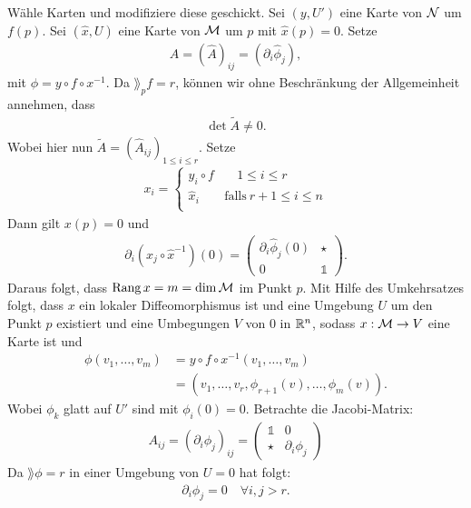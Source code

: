 \begin{bew}
Wähle Karten und modifiziere diese geschickt.
Sei $(y, U')$ eine Karte von $\mathcal{N}$ um $f(p)$.
Sei $(\hat{x}, U)$ eine Karte von $\mathcal{M}$ um $p$ mit $\hat{x}(p) = 0$.
Setze 
\begin{align*}
\hat{A} = (\hat{A})_{i j} = (\partial_i \hat{\phi}_j),
\end{align*}
mit $\phi = y \circ f \circ x^{-1}$.
Da $\rang_p f = r$, können wir ohne Beschränkung der Allgemeinheit annehmen, dass
\begin{align*}
\det \tilde{A} \neq 0.
\end{align*}
Wobei hier nun $\tilde{A} = (\hat{A}_{i j})_{1 \leq i \leq r}$.
Setze 
\begin{align*}
x_i = \left\{
\begin{array}{ll}
y_i \circ f & \quad 1 \leq i \leq r \\
\hat{x}_i & \textrm{falls} \ r+1 \leq i \leq n \\
\end{array}
\right. 
\end{align*}
Dann gilt $x(p)=0$ und 
\begin{align*}
\partial_i (x_j \circ \hat{x}^{-1})(0) = 
\left(\begin{matrix}
\partial_i \hat{\phi}_j (0) & \star \\ 
0 & \mathds{1}
\end{matrix} \right) .
\end{align*}
Daraus folgt, dass $\operatorname{Rang} x = m = \dim \mathcal{M}$ im Punkt $p$.
Mit Hilfe des Umkehrsatzes folgt, dass $x$ ein lokaler Diffeomorphismus ist 
und eine Umgebung $U$ um den Punkt $p$ existiert und eine Umbegungen $V$ von $0$ in $\mathbb{R}^n$, 
sodass $x: \mathcal{M} \to V$ eine Karte ist und
\begin{align*}
\phi (v_1, \dots, v_m) &= y \circ f \circ x^{-1}(v_1, \dots, v_m) \\
&= (v_1, \dots, v_r, \phi_{r+1}(v), \dots, \phi_m (v)).
\end{align*}
Wobei $\phi_k$ glatt auf $U'$ sind mit $\phi_i(0)=0$. 
Betrachte die Jacobi-Matrix:
\begin{align*}
A_{i j} = (\partial _i \phi_j )_{i j} = \begin{pmatrix}
\mathds{1} & 0 \\ 
\star & \partial_i \phi_j
\end{pmatrix} 
\end{align*}
Da $\rang \phi = r$ in einer Umgebung von $U=0$ hat folgt:
\begin{align*}
\partial_i \phi_j = 0 \quad \forall i, j > r.
\end{align*}
\end{bew}

